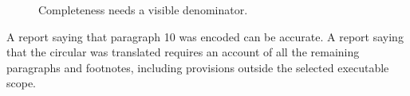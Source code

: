 \begin{figure}[H]
\centering
{}
\caption{Completeness needs a visible denominator.}\label{fig:teach-M01-03}
\end{figure}

A report saying that paragraph 10 was encoded can be accurate. A report saying that the circular was translated requires an account of all the remaining paragraphs and footnotes, including provisions outside the selected executable scope.

